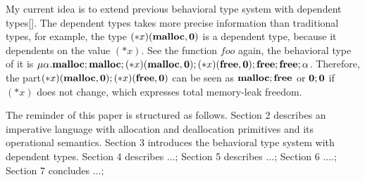 My current idea is to extend previous behavioral type system with
dependent types[]. The dependent types takes more precise information
than traditional types, for example, the type
\((*x)(\mathbf{malloc}, \mathbf{0})\) is a dependent type, because it dependents
on the value \((*x)\). See the function \(foo\) again, the behavioral
type of it is \(
\mu\alpha.\mathbf{malloc};\mathbf{malloc};(*x)(\mathbf{malloc}, \mathbf{0});(*x)(\mathbf{free}, \mathbf{0});\mathbf{free};\mathbf{free};\alpha
\). Therefore, the part\((*x)(\mathbf{malloc}, \mathbf{0});(*x)(\mathbf{free}, \mathbf{0})\)
can be seen as \(\mathbf{malloc};\mathbf{free}\) or \(\mathbf{0};\mathbf{0}\) if \((*x)\) does
not change, which expresses total memory-leak freedom.

The reminder of this paper is structured as follows. Section 2 describes an imperative language with allocation and deallocation primitives and its operational semantics. Section 3 introduces the behavioral type system with dependent types. Section 4 describes ...; Section 5 describes ...; Section 6 ....; Section 7 concludes ...; 
